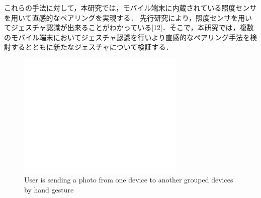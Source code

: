 これらの手法に対して，本研究では，モバイル端末に内蔵されている照度センサを用いて直感的なペアリングを実現する．
先行研究により，照度センサを用いてジェスチャ認識が出来ることがわかっている[12]．そこで，本研究では，複数のモバイル端末においてジェスチャ認識を行いより直感的なペアリング手法を検討するとともに新たなジェスチャについて検証する．


\begin{figure}[htbp]
  \begin{center}
   \includegraphics[width=80mm]{img/empty_white.png}
   \vspace{-1mm}
   \caption{User is sending a photo from one device to another grouped devices by hand gesture}
   \label{example_of_IllumiConnect}
  \end{center}
\end{figure}

